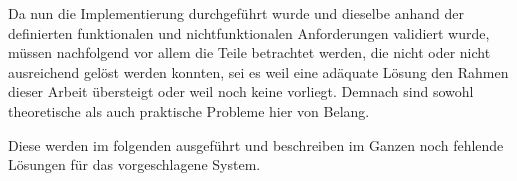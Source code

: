 Da nun die Implementierung durchgeführt wurde und dieselbe anhand der definierten funktionalen und nichtfunktionalen Anforderungen validiert wurde, müssen nachfolgend vor allem die Teile betrachtet werden, die nicht oder nicht ausreichend gelöst werden konnten, sei es weil eine adäquate Lösung den Rahmen dieser Arbeit übersteigt oder weil noch keine vorliegt. Demnach sind sowohl theoretische als auch praktische Probleme hier von Belang.

Diese werden im folgenden ausgeführt und beschreiben im Ganzen noch fehlende Lösungen für das vorgeschlagene System.

